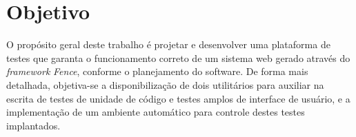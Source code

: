 \section{Objetivo}
O propósito geral deste trabalho é projetar e desenvolver uma plataforma de testes que garanta o funcionamento correto de um sistema web gerado através do \emph{framework} \emph{Fence}, conforme o planejamento do software. De forma mais detalhada, objetiva-se a disponibilização de dois utilitários para auxiliar na escrita de testes de unidade de código e testes amplos de interface de usuário, e a implementação de um ambiente automático para controle destes testes implantados.